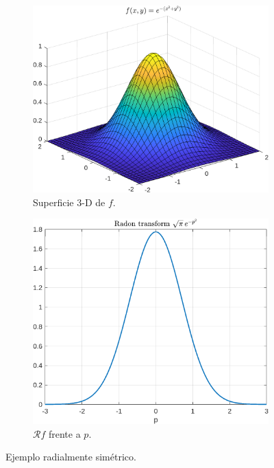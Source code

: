 \documentclass[11pt]{article}
\begin{document}
\begin{figure}[H]
\centering
\begin{subfigure}[b]{0.47\textwidth}
  \includegraphics[width=\linewidth]{figures/gaussian_surface.png}
  \caption{Superficie 3-D de $f$.}
\end{subfigure}\hfill
\begin{subfigure}[b]{0.47\textwidth}
  \includegraphics[width=\linewidth]{figures/gaussian_radon.png}
  \caption{$\mathcal Rf$ frente a $p$.}
\end{subfigure}
\caption{Ejemplo radialmente simétrico.}
\label{fig:gaussian}
\end{figure}
\FloatBarrier
\end{document}
